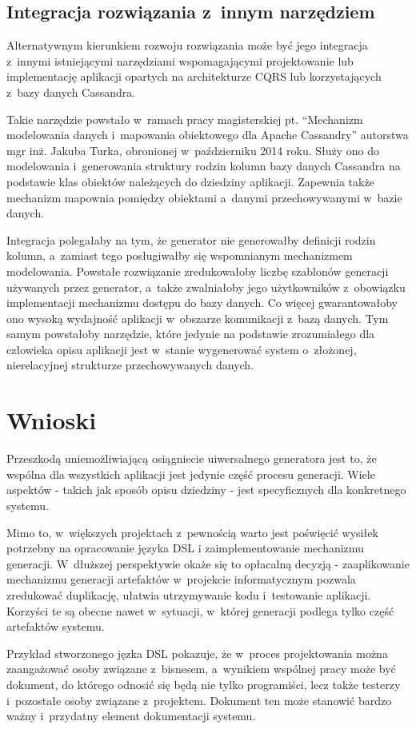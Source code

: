 \subsection{Integracja rozwiązania z~innym narzędziem}

Alternatywnym kierunkiem rozwoju rozwiązania może być jego integracja z~innymi istniejącymi narzędziami wspomagającymi projektowanie lub implementację aplikacji opartych na architekturze CQRS lub korzystających z~bazy danych Cassandra.

Takie narzędzie powstało w~ramach pracy magisterskiej pt. ``Mechanizm modelowania danych i~mapowania obiektowego dla Apache Cassandry'' autorstwa mgr inż. Jakuba Turka, obronionej w~październiku 2014 roku.
Służy ono do modelowania i~generowania struktury rodzin kolumn bazy danych Cassandra na podstawie klas obiektów należących do dziedziny aplikacji.
Zapewnia także mechanizm mapownia pomiędzy obiektami a~danymi przechowywanymi w~bazie danych.

Integracja polegałaby na tym, że generator nie generowałby definicji rodzin kolumn, a~zamiast tego posługiwałby się wspomnianym mechanizmem modelowania.
Powstałe rozwiązanie zredukowałoby liczbę szablonów generacji używanych przez generator, a~także zwalniałoby jego użytkowników z~obowiązku implementacji mechanizmu dostępu do bazy danych.
Co więcej gwarantowałoby ono wysoką wydajność aplikacji w~obszarze komunikacji z~bazą danych.
Tym samym powstałoby narzędzie, które jedynie na podstawie zrozumiałego dla człowieka opisu aplikacji jest w~stanie wygenerować system o~złożonej, nierelacyjnej strukturze przechowywanych danych.



\section{Wnioski}

Przeszkodą uniemożliwiającą osiągniecie uiwersalnego generatora jest to, że wspólna dla wszystkich aplikacji jest jedynie część procesu generacji.
Wiele aspektów - takich jak sposób opisu dziedziny - jest specyficznych dla konkretnego systemu.

Mimo to, w~większych projektach z~pewnością warto jest poświęcić wysiłek potrzebny na opracowanie języka DSL i zaimplementowanie mechanizmu generacji.
W~dłuższej perspektywie okaże się to opłacalną decyzją - zaaplikowanie mechanizmu generacji artefaktów w~projekcie informatycznym pozwala zredukować duplikację, ułatwia utrzymywanie kodu i~testowanie aplikacji.
Korzyści te są obecne nawet w~sytuacji, w~której  generacji podlega tylko część artefaktów systemu.

Przykład stworzonego jęzka DSL pokazuje, że w~proces projektowania można zaangażować osoby związane z~bisnesem, a~wynikiem wspólnej pracy może być dokument, do którego odnosić się będą nie tylko programiści, lecz także testerzy i~pozostałe osoby związane z~projektem.
Dokument ten może stanowić bardzo ważny i~przydatny element dokumentacji systemu.
